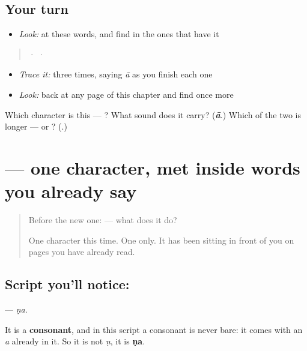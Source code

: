 \subsection*{Your turn}
\begin{itemize}
\raggedright
  \item \emph{Look:} at these words, and find  in the ones that have it
\end{itemize}

\begin{quote}
  ·    ·  
\end{quote}

\begin{itemize}
\raggedright
  \item \emph{Trace it:}  three times, saying \emph{ā} as you finish each one
  \item \emph{Look:} back at any page of this chapter and find  once more
\end{itemize}

\begin{tcolorbox}[breakable,colback=teal!4,colframe=teal!35!black,title={Before you move on}]
Which character is this — ? What sound does it carry? (\emph{\textbf{ā}}.) Which of the two is longer —  or ? (.)
\end{tcolorbox}
\section[\texorpdfstring{\ml{ണ} (ṇa)}{ണ (ṇa)}]{ — one character, met inside words you already say}

\label{lesson:ML-S113-letter-nna}



\begin{quote}
Before the new one:  — what does it do?

One character this time. One only. It has been sitting in front of you on pages you have already read.
\end{quote}

\subsection*{Script you'll notice: }
\textbf{} — \emph{ṇa}.

It is a \textbf{consonant}, and in this script a consonant is never bare: it comes with an \emph{a} already in it. So it is not \emph{ṇ}, it is \textbf{ṇa}.

